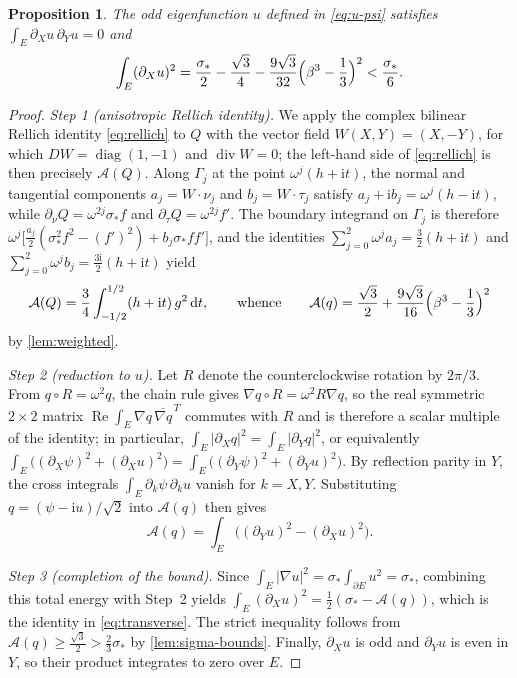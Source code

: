 \documentclass[11pt,reqno]{amsart}
\numberwithin{equation}{section}
\newtheorem{proposition}[proposition]{Proposition}
\theoremstyle{remark}
\newcommand{\dd}{\,\mathrm d}
\newcommand{\ii}{\mathrm i}
\newcommand{\om}{\omega}
\newcommand{\An}{\mathcal A}
\DeclareMathOperator{\Rea}{Re}
\begin{document}
\begin{proposition}\label{prop:transverse}
The odd eigenfunction $u$ defined in \eqref{eq:u-psi} satisfies
$\int_E\partial_Xu\,\partial_Yu=0$ and
\begin{equation}\label{eq:transverse}
 \int_E(\partial_Xu)^2
 =\frac{\sigma_*}2-\frac{\sqrt3}4-\frac{9\sqrt3}{32}
   \Bigl(\beta^3-\frac13\Bigr)^2<\frac{\sigma_*}6 .
\end{equation}
\end{proposition}
\begin{proof}
\emph{Step 1 (anisotropic Rellich identity).} We apply the complex bilinear
Rellich identity \eqref{eq:rellich} to $Q$ with the vector field
$W(X,Y)=(X,-Y)$, for which $DW=\operatorname{diag}(1,-1)$ and
$\operatorname{div}W=0$; the left-hand side of \eqref{eq:rellich} is then
precisely $\An(Q)$. Along $\Gamma_j$ at the point $\om^j(h+\ii t)$, the normal
and tangential components $a_j=W\cdot\nu_j$ and $b_j=W\cdot\tau_j$ satisfy
$a_j+\ii b_j=\om^j(h-\ii t)$, while $\partial_\nu Q=\om^{2j}\sigma_*f$ and
$\partial_\tau Q=\om^{2j}f'$. The boundary integrand on $\Gamma_j$ is therefore
$\om^j\bigl[\frac{a_j}2(\sigma_*^2f^2-(f')^2)+b_j\sigma_*ff'\bigr]$, and the
identities $\sum_{j=0}^2\om^ja_j=\frac32(h+\ii t)$ and
$\sum_{j=0}^2\om^jb_j=\frac{3\ii}2(h+\ii t)$ yield
\[
 \An(Q)=\frac34\int_{-1/2}^{1/2}(h+\ii t)\,g^2\dd t,
 \qquad\text{whence}\qquad
 \An(q)=\frac{\sqrt3}2+\frac{9\sqrt3}{16}\Bigl(\beta^3-\frac13\Bigr)^2
\]
by \cref{lem:weighted}.

\emph{Step 2 (reduction to $u$).} Let $R$ denote the counterclockwise rotation by
$2\pi/3$. From $q\circ R=\om^2q$, the chain rule gives $\nabla q\circ R=\om^2R\nabla q$,
so the real symmetric $2\times2$ matrix $\Rea\int_E\nabla q\,\overline{\nabla q}^{\,T}$
commutes with $R$ and is therefore a scalar multiple of the identity; in particular,
$\int_E|\partial_Xq|^2=\int_E|\partial_Yq|^2$, or equivalently
$\int_E\bigl((\partial_X\psi)^2+(\partial_Xu)^2\bigr)
=\int_E\bigl((\partial_Y\psi)^2+(\partial_Yu)^2\bigr)$. By reflection parity in
$Y$, the cross integrals $\int_E\partial_k\psi\,\partial_ku$ vanish for $k=X,Y$.
Substituting $q=(\psi-\ii u)/\sqrt2$ into $\An(q)$ then gives
\[
 \An(q)=\int_E\bigl((\partial_Yu)^2-(\partial_Xu)^2\bigr).
\]

\emph{Step 3 (completion of the bound).} Since
$\int_E|\nabla u|^2=\sigma_*\int_{\partial E}u^2=\sigma_*$, combining this total
energy with Step~2 yields $\int_E(\partial_Xu)^2=\frac12(\sigma_*-\An(q))$, which
is the identity in \eqref{eq:transverse}. The strict inequality follows from
$\An(q)\ge\frac{\sqrt3}2>\frac23\sigma_*$ by \cref{lem:sigma-bounds}.
Finally, $\partial_Xu$ is odd and $\partial_Yu$ is even in $Y$, so their product
integrates to zero over $E$.
\end{proof}
\end{document}
